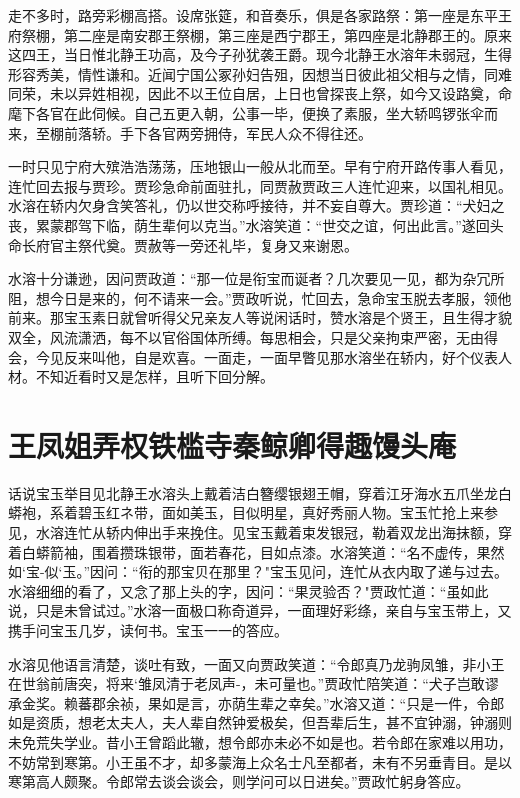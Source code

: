 走不多时，路旁彩棚高搭。设席张筵，和音奏乐，俱是各家路祭：第一座是东平王府祭棚，第二座是南安郡王祭棚，第三座是西宁郡王，第四座是北静郡王的。原来这四王，当日惟北静王功高，及今子孙犹袭王爵。现今北静王水溶年未弱冠，生得形容秀美，情性谦和。近闻宁国公冢孙妇告殂，因想当日彼此祖父相与之情，同难同荣，未以异姓相视，因此不以王位自居，上日也曾探丧上祭，如今又设路奠，命麾下各官在此伺候。自己五更入朝，公事一毕，便换了素服，坐大轿鸣锣张伞而来，至棚前落轿。手下各官两旁拥侍，军民人众不得往还。

一时只见宁府大殡浩浩荡荡，压地银山一般从北而至。早有宁府开路传事人看见，连忙回去报与贾珍。贾珍急命前面驻扎，同贾赦贾政三人连忙迎来，以国礼相见。水溶在轿内欠身含笑答礼，仍以世交称呼接待，并不妄自尊大。贾珍道：“犬妇之丧，累蒙郡驾下临，荫生辈何以克当。”水溶笑道：“世交之谊，何出此言。”遂回头命长府官主祭代奠。贾赦等一旁还礼毕，复身又来谢恩。

水溶十分谦逊，因问贾政道：“那一位是衔宝而诞者？几次要见一见，都为杂冗所阻，想今日是来的，何不请来一会。”贾政听说，忙回去，急命宝玉脱去孝服，领他前来。那宝玉素日就曾听得父兄亲友人等说闲话时，赞水溶是个贤王，且生得才貌双全，风流潇洒，每不以官俗国体所缚。每思相会，只是父亲拘束严密，无由得会，今见反来叫他，自是欢喜。一面走，一面早瞥见那水溶坐在轿内，好个仪表人材。不知近看时又是怎样，且听下回分解。

\chapter{王凤姐弄权铁槛寺\ttlbreak 秦鲸卿得趣馒头庵}

话说宝玉举目见北静王水溶头上戴着洁白簪缨银翅王帽，穿着江牙海水五爪坐龙白蟒袍，系着碧玉红ネ带，面如美玉，目似明星，真好秀丽人物。宝玉忙抢上来参见，水溶连忙从轿内伸出手来挽住。见宝玉戴着束发银冠，勒着双龙出海抹额，穿着白蟒箭袖，围着攒珠银带，面若春花，目如点漆。水溶笑道：“名不虚传，果然如`宝-似`玉。”因问：“衔的那宝贝在那里？"宝玉见问，连忙从衣内取了递与过去。水溶细细的看了，又念了那上头的字，因问：“果灵验否？"贾政忙道：“虽如此说，只是未曾试过。”水溶一面极口称奇道异，一面理好彩绦，亲自与宝玉带上，又携手问宝玉几岁，读何书。宝玉一一的答应。

水溶见他语言清楚，谈吐有致，一面又向贾政笑道：“令郎真乃龙驹凤雏，非小王在世翁前唐突，将来`雏凤清于老凤声-，未可量也。”贾政忙陪笑道：“犬子岂敢谬承金奖。赖蕃郡余祯，果如是言，亦荫生辈之幸矣。”水溶又道：“只是一件，令郎如是资质，想老太夫人，夫人辈自然钟爱极矣，但吾辈后生，甚不宜钟溺，钟溺则未免荒失学业。昔小王曾蹈此辙，想令郎亦未必不如是也。若令郎在家难以用功，不妨常到寒第。小王虽不才，却多蒙海上众名士凡至都者，未有不另垂青目。是以寒第高人颇聚。令郎常去谈会谈会，则学问可以日进矣。”贾政忙躬身答应。

